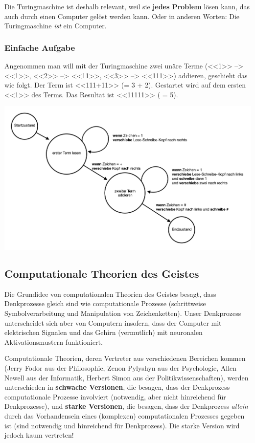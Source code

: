 \documentclass[../main.tex]{subfiles}
\begin{document}
Die Turingmaschine ist deshalb relevant, weil sie \textbf{jedes Problem} lösen kann, das auch durch einen Computer gelöst werden kann. Oder in anderen Worten: Die Turingmaschine \textit{ist} ein Computer. 

\subsubsection{Einfache Aufgabe}
Angenommen man will mit der Turingmaschine zwei unäre Terme (<<1>> --> <<1>>, <<2>> --> <<11>>, <<3>> --> <<111>>) addieren, geschieht das wie folgt. Der Term ist <<111+11>> (= 3 + 2). Gestartet wird auf dem ersten <<1>> des Terms. Das Resultat ist <<11111>> ( = 5).

\includegraphics[width=\textwidth]{images/turingmaschine_unaere_terme_addieren.png}

\subsection{Computationale Theorien des Geistes}
Die Grundidee von computationalen Theorien des Geistes besagt, dass Denkprozesse gleich sind wie computationale Prozesse (schrittweise Symbolverarbeitung und Manipulation von Zeichenketten). Unser Denkprozess unterscheidet sich aber von Computern insofern, dass der Computer mit elektrischen Signalen und das Gehirn (vermutlich) mit neuronalen Aktivationsmustern funktioniert. 

Computationale Theorien, deren Vertreter aus verschiedenen Bereichen kommen (Jerry Fodor aus der Philosophie, Zenon Pylyshyn aus der Psychologie, Allen Newell aus der Informatik, Herbert Simon aus der Politikwissenschaften), werden unterschieden in \textbf{schwache Versionen}, die besagen, dass der Denkprozess computationale Prozesse involviert (notwendig, aber nicht hinreichend für Denkprozesse), und \textbf{starke Versionen}, die besagen, dass der Denkprozess \textit{allein} durch das Vorhandensein eines (komplexen) computationalen Prozesses gegeben ist (sind notwendig und hinreichend für Denkprozess). Die starke Version wird jedoch kaum vertreten!
\end{document}

